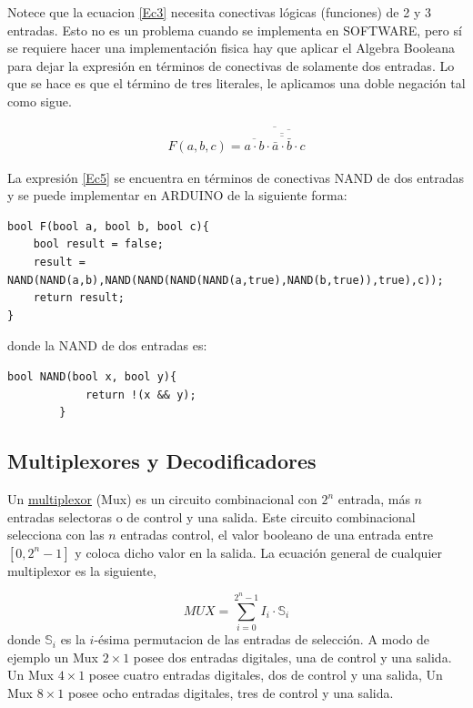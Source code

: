 Notece que la ecuacion \eqref{Ec3} necesita conectivas lógicas (funciones) de 2 y 3 entradas. Esto no es un problema cuando se implementa en SOFTWARE, pero sí se requiere hacer una implementación fisica hay que aplicar el Algebra Booleana para dejar la expresión en términos de conectivas de solamente dos entradas. Lo que se hace es que el término de tres literales, le aplicamos una doble negación tal como sigue.

\begin{eqnarray}
\label{Ec5}
F(a,b,c)=\overline{\overline{a\cdot b}\cdot\overline{\overline{\overline{\bar{a}\cdot \bar{b}}}\cdot c}} 
\end{eqnarray}

La expresión \eqref{Ec5} se encuentra en términos de conectivas NAND de dos entradas y se puede implementar en ARDUINO  de la siguiente forma:
{\footnotesize 
\begin{lstlisting}[language=Arduino,numbers=none, showstringspaces=false]
bool F(bool a, bool b, bool c){
	bool result = false;
	result = NAND(NAND(a,b),NAND(NAND(NAND(NAND(a,true),NAND(b,true)),true),c));
	return result;
}
\end{lstlisting} 
}
donde la NAND de dos entradas es:

		\begin{lstlisting}[language=Arduino,numbers=none, showstringspaces=false]
		bool NAND(bool x, bool y){
			return !(x && y);
		}
		\end{lstlisting}

\subsection{Multiplexores y Decodificadores}

Un \href{https://es.wikipedia.org/wiki/Multiplexor}{multiplexor} (Mux) es un circuito combinacional con $2^{n}$ entrada, más $n$  entradas selectoras o de control y una salida. Este circuito combinacional selecciona con las $n$ entradas control,  el valor booleano de una entrada entre $\left[ 0,2^{n}-1\right]$ y coloca dicho valor en la salida. La ecuación general de cualquier multiplexor es la siguiente,

\begin{equation}
MUX=\sum_{i=0}^{2^{n}-1} I_{i}\cdot \mathbb{S}_i
\end{equation}
donde $\mathbb{S}_i$  es la $i$-ésima permutacion de las entradas de selección. A modo de ejemplo un Mux $2 \times 1$
 posee dos entradas digitales, una de control y una salida. Un Mux $4 \times 1$ posee cuatro entradas digitales, dos de control y una salida, Un Mux $8 \times 1$ posee ocho entradas digitales, tres de control y una salida.
 
